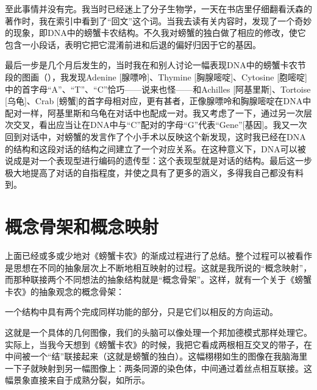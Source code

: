 \begin{description}[wide,format=\em\itemcolon,labelsep=\ccwd]
至此事情并没有完。我当时已经迷上了分子生物学，一天在书店里仔细翻看沃森的著作时，我在索引中看到了“回文”这个词。当我去读有关内容时，发现了一个奇妙的现象，即DNA中的螃蟹卡农结构。不久我对螃蟹的独白做了相应的修改，使它包含一小段话，表明它把它混淆前进和后退的偏好归因于它的基因。

\item[末期]最后一步是几个月后发生的，当时我在和别人讨论一幅表现DNA中的螃蟹卡农节段的图画（），我发现Adenine [腺嘌呤]、Thymine [胸腺嘧啶]、Cytosine [胞嘧啶]中的首字母“A”、“T”、“C”恰巧——说来也怪——和Achilles [阿基里斯]、Tortoise [乌龟]、Crab [螃蟹]的首字母相对应，更有甚者，正像腺嘌呤和胸腺嘧啶在DNA中配对一样，阿基里斯和乌龟在对话中也配成一对。我又考虑了一下，通过另一次层次交叉，看出应当让在DNA中与“C”配对的字母“G”代表“Gene”[基因]。我又一次回到对话中，对螃蟹的发言作了个小手术以反映这个新发现，这时我已经在DNA的结构和这段对话的结构之间建立了一个对应关系。在这种意义下，DNA可以被说成是对一个表现型进行编码的遗传型：这个表现型就是对话的结构。最后这一步极大地提高了对话的自指程度，并使之具有了更多的涵义，多得我自己都没有料到。

\end{description}

\section{概念骨架和概念映射}

上面已经或多或少地对《螃蟹卡农》的渐成过程进行了总结。整个过程可以被看作是思想在不同的抽象层次上不断地相互映射的过程。这就是我所说的“概念映射”，而那种联接两个不同想法的抽象结构就是“概念骨架”。这样，就有一个关于《螃蟹卡农》的抽象观念的概念骨架：

\begin{block}
一个结构中具有两个完成同样功能的部分，只是它们以相反的方向运动。
\end{block}

这就是一个具体的几何图像，我们的头脑可以像处理一个邦加德模式那样处理它。实际上，当我今天想到《螃蟹卡农》的时候，我把它看成两根相互交叉的带子，在中间被一个“结”联接起来（这就是螃蟹的独白）。这幅栩栩如生的图像在我脑海里一下子就映射到另一幅图像上：两条同源的染色体，中间通过着丝点相互联接。这幅景象直接来自于成熟分裂，如所示。

